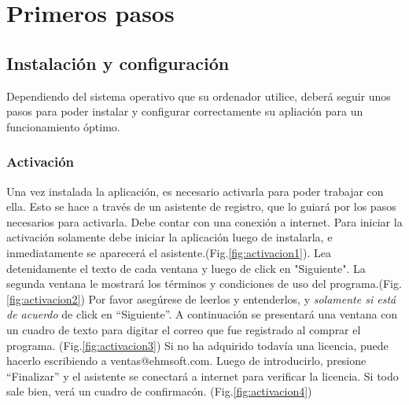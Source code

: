 \chapter{Primeros pasos}
\setcounter{page}{4}

\section{Instalaci\'on y configuraci\'on}
Dependiendo del sistema operativo que su ordenador utilice, deber\'a seguir unos pasos para poder instalar y
configurar correctamente su apliaci\'on para un funcionamiento \'optimo. 
\subsection{\windows}
\subsection{\mac}
\subsection{\linux}
\subsection{Activaci\'on}
Una vez instalada la aplicaci\'on, es necesario activarla para poder trabajar con ella. Esto se hace a trav\'es de un asistente de registro, que lo guiar\'a por los pasos necesarios para activarla. Debe contar con una conexi\'on a internet. Para iniciar la activaci\'on solamente debe iniciar la aplicaci\'on luego de instalarla, e inmediatamente se aparecer\'a el asistente.(Fig.\ref{fig:activacion1}). Lea detenidamente el texto de cada ventana y luego de click en "Siguiente". La segunda ventana le mostrar\'a los t\'erminos y condiciones de uso del programa.(Fig.\ref{fig:activacion2}) Por favor aseg\'urese de leerlos y entenderlos, y \emph{solamente si est\'a de acuerdo} de click en ``Siguiente''. A continuaci\'on se presentar\'a una ventana con un cuadro de texto para digitar el correo que fue registrado al comprar el programa. (Fig.\ref{fig:activacion3}) Si no ha adquirido todav\'ia una licencia, puede hacerlo escribiendo a \mbox{ventas@ehmsoft.com}. Luego de introducirlo, presione ``Finalizar'' y el asistente se conectar\'a a internet para verificar la licencia. Si todo sale bien, ver\'a un cuadro de confirmac\'on. (Fig.\ref{fig:activacion4}) 



